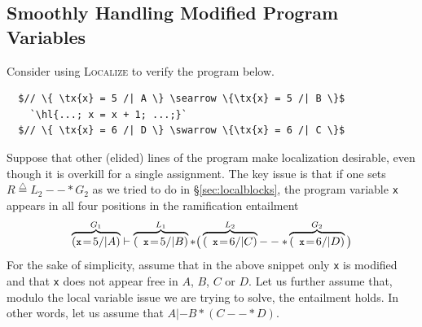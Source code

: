 \documentclass[acmsmall,screen]{acmart}
\newcommand{\li}[1]{{\texttt{\small #1}}}
\newcommand\hide[1]{}
\newcommand{\defeq}{\mathbin{\stackrel{\triangle}{=}}}
\newcommand{\tx}[1]{\text{#1}}
\newcommand{\hl}[1]{\colorbox{lightgray}{#1}}
\begin{document}
\hide{
\subsection{Forward ramification}
\marginpar{\tiny \color{blue} What to do about this now that H/S has been cut?}

{\color{magenta}The forward style of reasoning employed by HIP/SLEEK uses the existential wand $--o$ to express ramifications instead of the more typical universal wand $--*$.  The standard $--*$ form of ramification is weaker, but the strongest postcondition style using $--o$ can also get the job done without too much extra work since:}
\vspace*{5.25ex}
\vspace*{-6ex}
\[
\inferrule[WandToEwand]
{G_1 |- L_1 * (L_2 --* G_2)}
{(L_1 --o G_1) * L_2 |- G_2} \m{precise}(L_1)
\]
\[
\begin{array}{@{}l@{}l@{}}
\m{precise}(P) ~ \defeq ~ & (\sigma_1 |= P) => (\sigma_2 |= P) => \\
& ~~ (\sigma_1 \oplus \sigma_1' \! = \! \sigma) => (\sigma_2 \oplus \sigma_2' \! = \! \sigma) => \sigma_1 \! = \! \sigma_2
\end{array}
\]
In \S\ref{sec:ramifylib} we will discuss the ``supplemental'' spatial libraries, which ensures
the preciseness of our key predicates.
}

\subsection{Smoothly Handling Modified Program Variables}
\label{sec:freevars}
Consider using \textsc{Localize} to verify the program below.
\vspace{-1ex}
\begin{lstlisting}
  $// \{ \tx{x} = 5 /| A \} \searrow \{\tx{x} = 5 /| B \}$
    `\hl{...; x = x + 1; ...;}`
  $// \{ \tx{x} = 6 /| D \} \swarrow \{\tx{x} = 6 /| C \}$
\end{lstlisting}
\vspace{-1ex}
Suppose that other (elided) lines of the program make localization desirable, even though it is overkill for a single assignment.  The key issue is that if one sets $R \defeq L_2 --* G_2$ as
we tried to do in \S\ref{sec:localblocks}, the program variable {\li{x}} appears 
in all four positions in the ramification entailment
\vspace{-1ex}
\[
\overbrace{(\li{x} \! = \! 5 /| A)}^{G_1} |- \overbrace{(\li{x} \! = \! 5 /| B)}^{L_1} * \big(\overbrace{(\li{x} \! = \! 6 /| C)}^{L_2} --* \overbrace{(\li{x} \! = \! 6 /| D)}^{G_2}\big)
\vspace{-1ex}
\]
For the sake of simplicity, assume that in the above snippet only \li{x} is modified
and that \li{x} does not appear free in $A$, $B$, $C$ or $D$.  Let us further assume
that, modulo the local variable issue we are trying to solve, the entailment holds.
In other words, let us assume that $A |- B * (C --* D)$.
\end{document}
